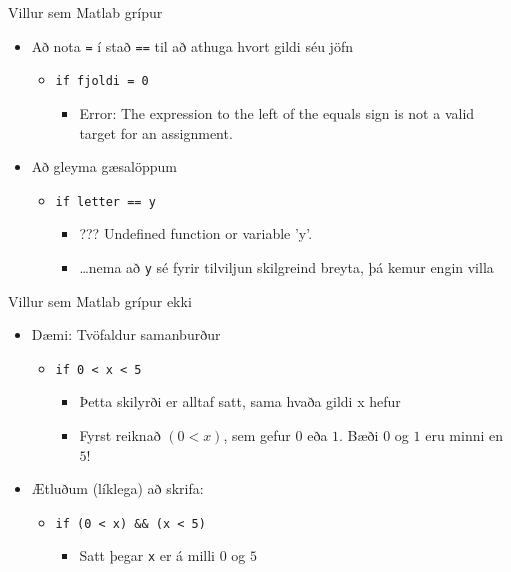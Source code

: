 \documentclass{beamer}
\begin{document}
\begin{frame}{Villur sem Matlab grípur}
\begin{itemize}
 \item Að nota \texttt{=} í stað \texttt{==} til að athuga hvort gildi séu jöfn
 \begin{itemize}
  \item \texttt{if fjoldi = 0}
  \begin{itemize}
   \item {\color{red} Error: The expression to the left of the equals sign is not a valid target for an assignment.}
  \end{itemize}
 \end{itemize}
 \item Að gleyma gæsalöppum
 \begin{itemize}
 \item \texttt{if letter == y}
  \begin{itemize}
   \item {\color{red} ??? Undefined function or variable 'y'.}
   \item \ldots nema að \texttt{y} sé fyrir tilviljun skilgreind breyta, þá kemur engin villa
  \end{itemize}
 \end{itemize}
\end{itemize}
\end{frame}

\begin{frame}{Villur sem Matlab grípur ekki}
\begin{itemize}
 \item Dæmi: Tvöfaldur samanburður
 \begin{itemize}
  \item \texttt{if 0 < x < 5}
  \begin{itemize}
   \item Þetta skilyrði er alltaf satt, sama hvaða gildi x hefur
   \item Fyrst reiknað $(0 < x)$, sem gefur $0$ eða $1$.  Bæði $0$ og $1$ eru minni en $5$!
  \end{itemize}
 \end{itemize}
 \item Ætluðum (líklega) að skrifa:
 \begin{itemize}
 \item \texttt{if (0 < x) \&\& (x < 5)}
  \begin{itemize}
   \item Satt þegar \texttt{x} er á milli $0$ og $5$
  \end{itemize}
 \end{itemize}
\end{itemize}
\end{frame}
\end{document}
